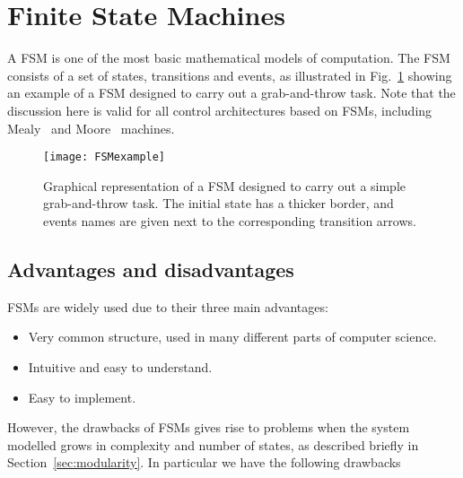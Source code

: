 \section{Finite State Machines}
\label{sec:FSM}
A FSM is one of the most basic mathematical models of computation.
The FSM consists of a set of states, transitions and events, as illustrated in Fig.~\ref{Arch.fig.FSM} showing an example of a FSM designed to carry out a grab-and-throw task. 
Note that the discussion here is valid for all  control architectures  based on FSMs, including Mealy~\cite{moore1956gedanken} and Moore~\cite{mealy1955method} machines.
\begin{figure}[h]
\centering
\texttt{[image: FSMexample]} 
   \caption{Graphical representation of a FSM designed to carry out a simple grab-and-throw task. The initial state has a thicker border, and events names are given next to the corresponding transition arrows.}
    \label{Arch.fig.FSM}
\end{figure}



\subsection{Advantages and disadvantages}
FSMs are widely used due to their three main advantages:

\begin{itemize}
\item Very common structure, used in many different parts of computer science.
\item  Intuitive and easy to understand.
\item Easy to implement. 
\end{itemize}

However, the drawbacks of FSMs gives rise to problems when the system modelled grows in complexity and number of states, as described briefly in Section~\ref{sec:modularity}.
In particular we have the following drawbacks

